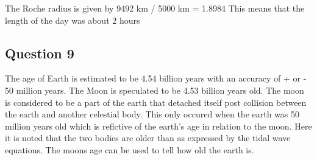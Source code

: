 \documentclass[11pt]{article}
\begin{document}
The Roche radius is given by 9492 km / 5000 km = 1.8984 This means that
the length of the day was about 2 hours

\newpage
\subsection{Question 9}\label{question-9}

    The age of Earth is estimated to be 4.54 billion years with an accuracy
of + or - 50 million years. The Moon is speculated to be 4.53 billion
years old. The moon is considered to be a part of the earth that
detached itself post collision between the earth and another celestial
body. This only occured when the earth was 50 million years old which is
reflctive of the earth's age in relation to the moon. Here it is noted
that the two bodies are older than as expressed by the tidal wave
equations. The moons age can be used to tell how old the earth is.

    
\end{document}
